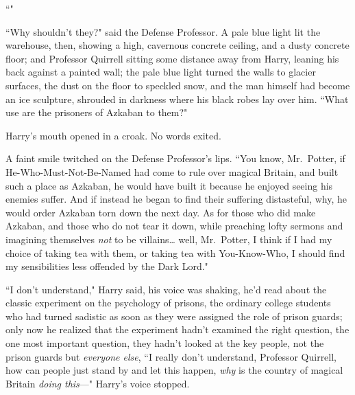 ``"

``Why shouldn't they?" said the Defense Professor. A pale blue light lit the warehouse, then, showing a high, cavernous concrete ceiling, and a dusty concrete floor; and Professor Quirrell sitting some distance away from Harry, leaning his back against a painted wall; the pale blue light turned the walls to glacier surfaces, the dust on the floor to speckled snow, and the man himself had become an ice sculpture, shrouded in darkness where his black robes lay over him. ``What use are the prisoners of Azkaban to them?"

Harry's mouth opened in a croak. No words exited.

A faint smile twitched on the Defense Professor's lips. ``You know, Mr.~Potter, if He-Who-Must-Not-Be-Named had come to rule over magical Britain, and built such a place as Azkaban, he would have built it because he enjoyed seeing his enemies suffer. And if instead he began to find their suffering distasteful, why, he would order Azkaban torn down the next day. As for those who did make Azkaban, and those who do not tear it down, while preaching lofty sermons and imagining themselves \emph{not} to be villains{\ldots} well, Mr.~Potter, I think if I had my choice of taking tea with them, or taking tea with You-Know-Who, I should find my sensibilities less offended by the Dark Lord."

``I don't understand," Harry said, his voice was shaking, he'd read about the classic experiment on the psychology of prisons, the ordinary college students who had turned sadistic as soon as they were assigned the role of prison guards; only now he realized that the experiment hadn't examined the right question, the one most important question, they hadn't looked at the key people, not the prison guards but \emph{everyone else}, ``I really don't understand, Professor Quirrell, how can people just stand by and let this happen, \emph{why} is the country of magical Britain \emph{doing this}—" Harry's voice stopped.

